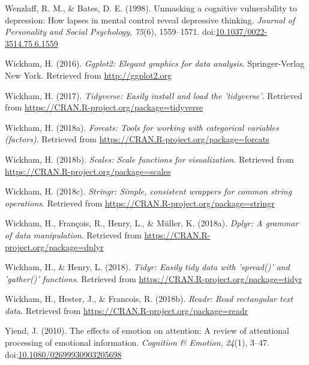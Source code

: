 \documentclass[man,floatsintext]{apa6}
\begin{document}
\leavevmode\hypertarget{ref-Wenzlaff1998}{}%
Wenzlaff, R. M., \& Bates, D. E. (1998). Unmasking a cognitive vulnerability to depression: How lapses in mental control reveal depressive thinking. \emph{Journal of Personality and Social Psychology}, \emph{75}(6), 1559--1571. doi:\href{https://doi.org/10.1037/0022-3514.75.6.1559}{10.1037/0022-3514.75.6.1559}

\leavevmode\hypertarget{ref-R-ggplot2}{}%
Wickham, H. (2016). \emph{Ggplot2: Elegant graphics for data analysis}. Springer-Verlag New York. Retrieved from \url{http://ggplot2.org}

\leavevmode\hypertarget{ref-R-tidyverse}{}%
Wickham, H. (2017). \emph{Tidyverse: Easily install and load the 'tidyverse'}. Retrieved from \url{https://CRAN.R-project.org/package=tidyverse}

\leavevmode\hypertarget{ref-R-forcats}{}%
Wickham, H. (2018a). \emph{Forcats: Tools for working with categorical variables (factors)}. Retrieved from \url{https://CRAN.R-project.org/package=forcats}

\leavevmode\hypertarget{ref-R-scales}{}%
Wickham, H. (2018b). \emph{Scales: Scale functions for visualization}. Retrieved from \url{https://CRAN.R-project.org/package=scales}

\leavevmode\hypertarget{ref-R-stringr}{}%
Wickham, H. (2018c). \emph{Stringr: Simple, consistent wrappers for common string operations}. Retrieved from \url{https://CRAN.R-project.org/package=stringr}

\leavevmode\hypertarget{ref-R-dplyr}{}%
Wickham, H., François, R., Henry, L., \& Müller, K. (2018a). \emph{Dplyr: A grammar of data manipulation}. Retrieved from \url{https://CRAN.R-project.org/package=dplyr}

\leavevmode\hypertarget{ref-R-tidyr}{}%
Wickham, H., \& Henry, L. (2018). \emph{Tidyr: Easily tidy data with 'spread()' and 'gather()' functions}. Retrieved from \url{https://CRAN.R-project.org/package=tidyr}

\leavevmode\hypertarget{ref-R-readr}{}%
Wickham, H., Hester, J., \& Francois, R. (2018b). \emph{Readr: Read rectangular text data}. Retrieved from \url{https://CRAN.R-project.org/package=readr}

\leavevmode\hypertarget{ref-Yiend2010}{}%
Yiend, J. (2010). The effects of emotion on attention: A review of attentional processing of emotional information. \emph{Cognition \& Emotion}, \emph{24}(1), 3--47. doi:\href{https://doi.org/10.1080/02699930903205698}{10.1080/02699930903205698}

\endgroup
\end{document}
